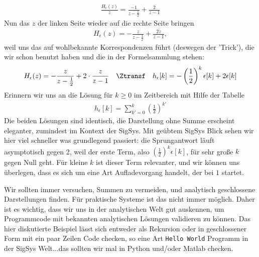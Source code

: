 \begin{ExCalc}
\begin{align}
\frac{H_\epsilon(z)}{z} = \frac{-1}{z-\frac{1}{2}} + \frac{2}{z-1}
\end{align}
Nun das $z$ der linken Seite wieder auf die rechte Seite bringen
\begin{align}
H_\epsilon(z) = -\frac{z}{z-\frac{1}{2}} + \frac{2 z}{z-1},
\end{align}
weil uns das auf wohlbekannte Korrespondenzen führt (deswegen der 'Trick'),
die wir schon benutzt haben und die in der Formelsammlung stehen:
\begin{align}
H_\epsilon(z) = -\frac{z}{z-\frac{1}{2}} + 2\cdot\frac{z}{z-1}
\quad\Ztransf\quad
h_\epsilon[k] = - \left(\frac{1}{2}\right)^k \epsilon[k] + 2 \epsilon[k]
\end{align}
Erinnern wir uns an die Lösung für $k \geq 0$ im Zeitbereich mit Hilfe der Tabelle
\begin{align}
h_\epsilon[k] = \sum_{k'=0}^k \left(\frac{1}{2}\right)^{k'}
\end{align}
Die beiden Lösungen sind identisch, die Darstellung ohne Summe erscheint
eleganter, zumindest im Kontext der SigSys. Mit geübtem SigSys Blick
sehen wir hier viel schneller was grundlegend passiert: die Sprungantwort
läuft asymptotisch gegen 2, weil der erste Term, also
$(\frac{1}{2})^k \epsilon[k]$, für sehr große $k$ gegen Null geht.
Für kleine $k$ ist dieser Term relevanter, und wir können uns überlegen, dass
es sich um eine Art Aufladevorgang handelt, der bei $1$ startet.

Wir sollten immer versuchen, Summen zu vermeiden, und analytisch geschlossene
Darstellungen finden. Für praktische Systeme ist das nicht immer möglich.
Daher ist es wichtig, dass wir uns in der analytischen Welt gut auskennen, um
Programmcode mit bekannten analytischen Lösungen validieren zu können.
%
Das hier diskutierte Beispiel lässt sich entweder als Rekursion oder in geschlossener
Form mit ein paar Zeilen Code checken, so eine Art \texttt{Hello World} Programm
in der SigSys Welt...das sollten wir mal in Python und/oder Matlab checken.
\end{ExCalc}
